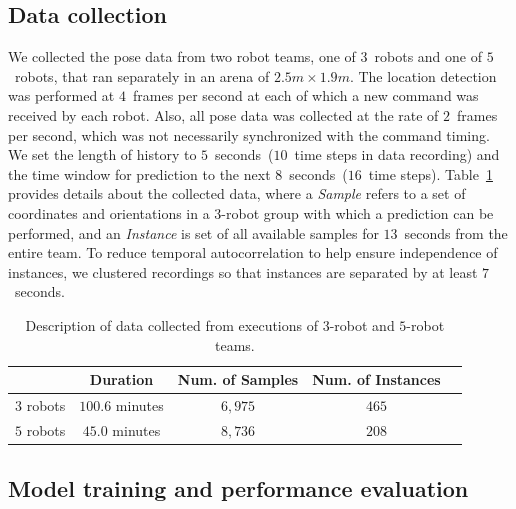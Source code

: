 \documentclass[letterpaper, 10 pt, conference]{ieeeconf}  %
\begin{document}
    \subsection{Data collection}

    We collected the pose data from two robot teams, one of
    $3$~robots and one of $5$~robots, that ran separately in an arena of
    $2.5 m \times 1.9 m$. The location detection was performed at
    $4$~frames per second at each of which a new command was received by
    each robot. Also, all pose data was collected at the rate of
    $2$~frames per second, which was not necessarily synchronized with
    the command timing. We set the length of history to
    $5$~seconds~($10$~time steps in data recording) and the time window
    for prediction to the next $8$~seconds~($16$~time steps).
    Table~\ref{table:data_description} provides details about the
    collected data, where a \emph{Sample} refers to a set of coordinates and
    orientations in a 3-robot group with which a prediction can be
    performed, and an \emph{Instance} is set of all available samples
    for $13$~seconds from the entire team. To reduce temporal
    autocorrelation to help ensure independence of instances, we
    clustered recordings so that instances are separated by at least
    $7$~seconds.
	\setlength{\tabcolsep}{0.5em} %
	{\renewcommand{\arraystretch}{1.2}%
		\begin{table}[t]
			\centering
			\begin{tabular}{|c|c|c|c|c|}
				\hline
							&  Duration & Num. of Samples & Num. of Instances  \\ \hline
				$3$ robots & $100.6$ minutes & $6,975$ & $465$  \\ \hline
				$5$ robots & $45.0$ minutes  & $8,736$ & $208$  \\ \hline
			\end{tabular}
			\caption{Description of data collected from executions of $3$-robot and $5$-robot teams.}
			\label{table:data_description}
		\end{table}
	}

    \subsection{Model training and performance evaluation}
\end{document}
